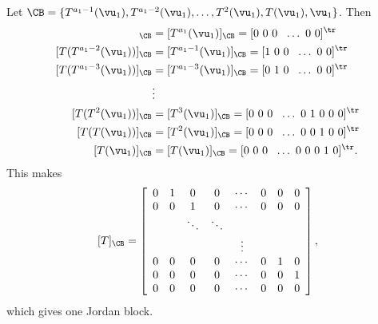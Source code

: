  Let $\CB = \{T^{a_1-1}(\vu_1), T^{a_1-2}(\vu_1), \ldots, T^2(\vu_1), T(\vu_1), \vu_1\}$.  Then
\begin{align*}
[T(T^{a_1-1}(\vu_1))]_{\CB} &= [T^{a_1}(\vu_1)]_{\CB} = [0 \ 0 \ 0 \  \  \ldots \ 0 \ 0]^{\tr} \\
[T(T^{a_1-2}(\vu_1))]_{\CB} &= [T^{a_1-1}(\vu_1)]_{\CB} = [1 \ 0 \ 0 \ \  \ldots \ 0 \ 0]^{\tr} \\ 
[T(T^{a_1-3}(\vu_1))]_{\CB} &= [T^{a_1-3}(\vu_1)]_{\CB} = [0 \ 1 \ 0 \ \  \ldots \ 0 \ 0]^{\tr} \\ 
	&\vdots \\
[T(T^2(\vu_1))]_{\CB} &= [T^3(\vu_1)]_{\CB} = [0 \ 0 \ 0 \  \ \ldots \ 0 \ 1 \ 0 \ 0 \ 0]^{\tr} \\ 
[T(T(\vu_1))]_{\CB} &= [T^2(\vu_1)]_{\CB} = [0 \ 0 \ 0 \  \ \ldots \ 0 \ 0 \ 1 \ 0 \ 0]^{\tr} \\ 
[T(\vu_1)]_{\CB} &= [T(\vu_1)]_{\CB} = [0 \ 0 \ 0 \  \ \ldots \ 0 \ 0 \ 0 \ 1 \ 0]^{\tr}.
\end{align*}
This makes
\[[T]_{\CB} =  \left[ \begin{array}{cccccccc} 
0&1&0&0&\cdots & 0 &0&0 \\ 
0&0&1&0&\cdots & 0&0&0 \\ 
&&\ddots&\ddots &&  &&\\  
&&&&\vdots &&&  \\ 
0&0&0&0&\cdots & 0&1&0 \\   
0&0&0&0&\cdots & 0&0&1 \\  
0&0&0&0&\cdots & 0&0&0 \\   
\end{array} \right],\]
which gives one Jordan block. 

